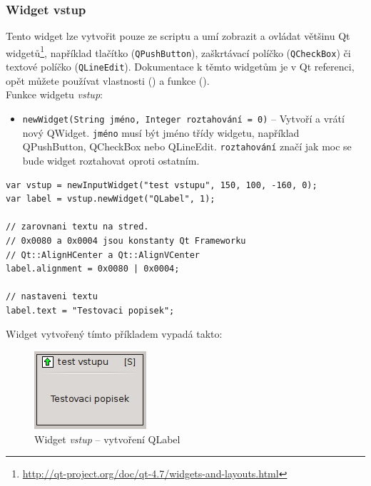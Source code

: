 \documentclass[12pt, a4paper, oneside]{article}
\newcommand{\It}{\textit}  %
\begin{document}
\subsubsection*{Widget vstup}
Tento widget lze vytvořit pouze ze scriptu a umí zobrazit a ovládat většinu Qt widgetů\footnote{\url{http://qt-project.org/doc/qt-4.7/widgets-and-layouts.html}}, například tlačítko (\verb/QPushButton/), zaškrtávací políčko (\verb/QCheckBox/) či textové políčko (\verb/QLineEdit/). Dokumentace k těmto widgetům je v Qt referenci, opět můžete používat vlastnosti () a funkce ().\\
Funkce widgetu \It{vstup}:
\begin{itemize}
    \item {\color{blue}\verb/newWidget(String jméno, Integer roztahování = 0)/} -- Vytvoří a vrátí nový QWidget. \verb/jméno/ musí být jméno třídy widgetu, například QPushButton, QCheckBox nebo QLineEdit. \verb/roztahování/ značí jak moc se bude widget roztahovat oproti ostatním.
\end{itemize}


\noindent\begin{minipage}{\textwidth}
\begin{lstlisting}[caption=Widget \It{vstup} -- vytvoření QLabel]
var vstup = newInputWidget("test vstupu", 150, 100, -160, 0);
var label = vstup.newWidget("QLabel", 1);

// zarovnani textu na stred. 
// 0x0080 a 0x0004 jsou konstanty Qt Frameworku 
// Qt::AlignHCenter a Qt::AlignVCenter
label.alignment = 0x0080 | 0x0004;

// nastaveni textu
label.text = "Testovaci popisek";
\end{lstlisting}
\end{minipage}

Widget vytvořený tímto příkladem vypadá takto:

\begin{figure}[H]
\begin{center}
\includegraphics{img/ref_input.png}
\caption{Widget \It{vstup} -- vytvoření QLabel}
\end{center}
\end{figure}
\end{document}
